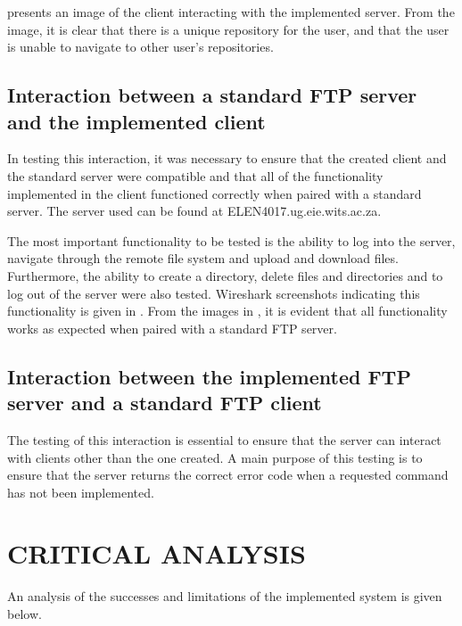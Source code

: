 \documentclass[10pt,twocolumn]{witseiepaper}
\begin{document}
 presents an image of the client interacting with the implemented server. From the image, it is clear that there is a unique repository for the user, and that the user is unable to navigate to other user's repositories.

\subsection{Interaction between a standard FTP server and the implemented client}
In testing this interaction, it was necessary to ensure that the created client and the standard server were compatible and that all of the functionality implemented in the client functioned correctly when paired with a standard server. The server used can be found at ELEN4017.ug.eie.wits.ac.za.

The most important functionality to be tested is the ability to log into the server, navigate through the remote file system and upload and download files. Furthermore, the ability to create a directory, delete files and directories and to log out of the server were also tested. Wireshark screenshots indicating this functionality is given in . From the images in , it is evident that all functionality works as expected when paired with a standard FTP server.

\subsection{Interaction between the implemented FTP server and a standard FTP client}
The testing of this interaction is essential to ensure that the server can interact with clients other than the one created. A main purpose of this testing is to ensure that the server returns the correct error code when a requested command has not been implemented.

\section{CRITICAL ANALYSIS}
An analysis of the successes and limitations of the implemented system is given below.
\end{document}
